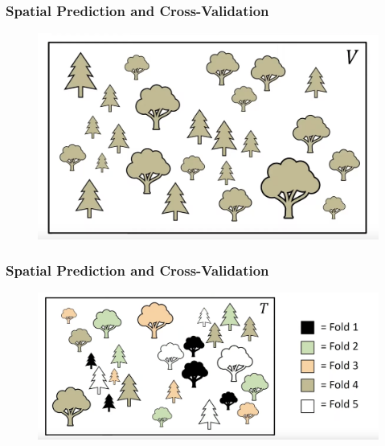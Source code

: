 \documentclass[
  shownotes,
  xcolor={svgnames},
  hyperref={colorlinks,citecolor=DarkBlue,linkcolor=andesred,urlcolor=DarkBlue}
  , aspectratio=169]{beamer}
\begin{document}
\begin{frame}[fragile]
\frametitle{Spatial Prediction and Cross-Validation}

  \begin{minipage}[c]{0.6\linewidth}
        
      \begin{figure}[H] \centering
        \captionsetup{justification=centering}
        \includegraphics[scale=0.3]{figures/spatial_cross/fig03.png}
      \end{figure}
           
    \end{minipage}
    \hfill
    \begin{minipage}[t]{0.35\linewidth}%
    

    \end{minipage}

\end{frame}
\begin{frame}[fragile]
\frametitle{Spatial Prediction and Cross-Validation}

  \begin{minipage}[c]{0.6\linewidth}
        
      \begin{figure}[H] \centering
        \captionsetup{justification=centering}
        \includegraphics[scale=0.3]{figures/spatial_cross/fig04.png}
      \end{figure}
           
    \end{minipage}
    \hfill
    \begin{minipage}[t]{0.35\linewidth}%
    

    \end{minipage}

\end{frame}
\end{document}
